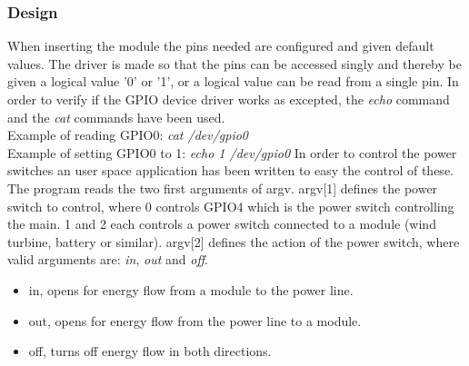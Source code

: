 \subsubsection{Design}
When inserting the module the pins needed are configured and given default values. The driver is made so that the pins can be accessed singly and thereby be given a logical value '0' or '1', or a logical value can be read from a single pin.
\p In order to verify if the GPIO device driver works as excepted, the \textit{echo} command and the \textit{cat} commands have been used.
\\ Example of reading GPIO0: \textit{cat /dev/gpio0}
\\ Example of setting GPIO0 to 1: \textit{echo 1 /dev/gpio0}
\p In order to control the power switches an user space application has been written to easy the control of these. The program reads the two first arguments of argv. argv[1] defines the power switch to control, where 0 controls GPIO4 which is the power switch controlling the main. 1 and 2 each controls a power switch connected to a module (wind turbine, battery or similar). argv[2] defines the action of the power switch, where valid arguments are: \textit{in}, \textit{out} and \textit{off}.
\begin{itemize}
	\item in, opens for energy flow from a module to the power line.
	\item out, opens for energy flow from the power line to a module.
	\item off, turns off energy flow in both directions.
\end{itemize}
